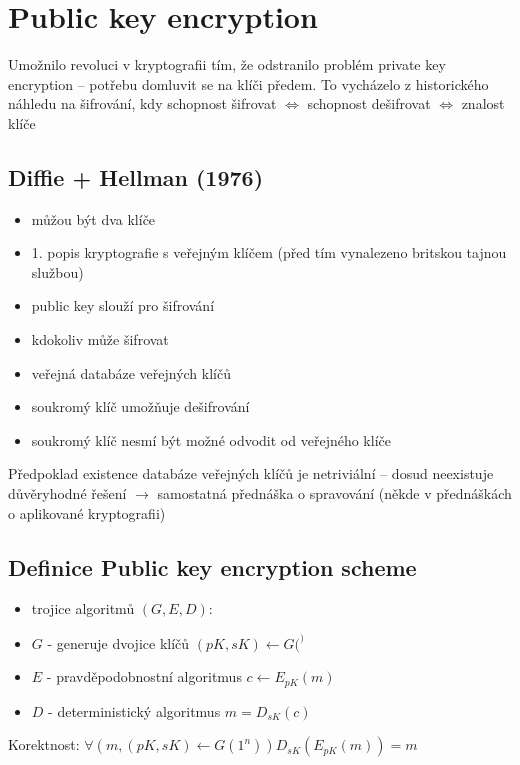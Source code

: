 \documentclass{article}
\begin{document}

\section{Public key encryption}

Umožnilo revoluci v kryptografii tím,
že odstranilo problém private key encryption
-- potřebu domluvit se na klíči předem.
To vycházelo z historického náhledu na šifrování,
kdy schopnost šifrovat
$\Leftrightarrow$ schopnost dešifrovat
$\Leftrightarrow$ znalost klíče

\subsection{Diffie + Hellman (1976)}
\begin{itemize}
\item můžou být dva klíče
\item 1. popis kryptografie s veřejným klíčem (před tím vynalezeno britskou tajnou službou)
\item public key slouží pro šifrování
\item kdokoliv může šifrovat
\item veřejná databáze veřejných klíčů
\item soukromý klíč umožňuje dešifrování
\item soukromý klíč nesmí být možné odvodit od veřejného klíče
\end{itemize}

Předpoklad existence databáze veřejných klíčů je netriviální
-- dosud neexistuje důvěryhodné řešení $\rightarrow$ samostatná přednáška o spravování (někde v přednáškách o aplikované kryptografii)


\subsection{Definice Public key encryption scheme}
\begin{itemize}
\item trojice algoritmů $(G, E, D)$:
\item $G$ - generuje dvojice klíčů $(pK, sK) \leftarrow G(^)$
\item $E$ - pravděpodobnostní algoritmus $c \leftarrow E_{pK}(m)$
\item $D$ - deterministický algoritmus $m = D_{sK}(c)$
\end{itemize}

Korektnost:
    $\forall (m, (pK, sK) \leftarrow G(1^n)) D_{sK}(E_{pK}(m)) = m$
\end{document}
